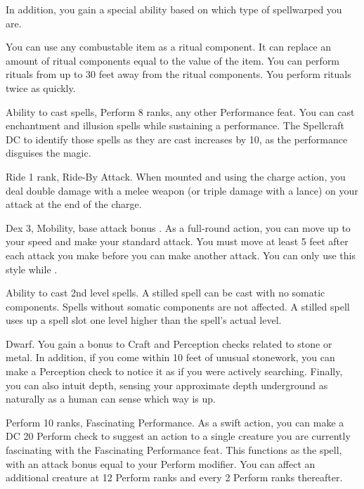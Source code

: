 In addition, you gain a special ability based on which type of spellwarped you are.

 \x
{} You can use any combustable item as a ritual component. It can replace an amount of ritual components equal to the value of the item.
 You can perform rituals from up to 30 feet away from the ritual components.
 You perform rituals twice as quickly.

\featpre Ability to cast spells, Perform 8 ranks, any other Performance feat.
\featben You can cast enchantment and illusion spells while sustaining a performance. The Spellcraft DC to identify those spells as they are cast increases by 10, as the performance disguises the magic.

 Ride 1 rank, Ride-By Attack.
 When mounted and using the charge action, you deal double damage with a melee weapon (or triple damage with a lance) on your attack at the end of the charge.%

 Dex 3, Mobility, base attack bonus .
 As a full-round action, you can move up to your speed and make your standard attack. You must move at least 5 feet after each attack you make before you can make another attack. You can only use this style while \unencumbered.

 Ability to cast 2nd level spells.
 A stilled spell can be cast with no somatic components. Spells without somatic components are not affected. A stilled spell uses up a spell slot one level higher than the spell's actual level.

 Dwarf.
 You gain a  bonus to Craft and Perception checks related to stone or metal. In addition, if you come within 10 feet of unusual stonework, you can make a Perception check to notice it as if you were actively searching. Finally, you can also intuit depth, sensing your approximate depth underground as naturally as a human can sense which way is up.

\featpre Perform 10 ranks, Fascinating Performance.
\featben As a swift action, you can make a DC 20 Perform check to suggest an action to a single creature you are currently fascinating with the Fascinating Performance feat. This functions as the  spell, with an attack bonus equal to your Perform modifier. You can affect an additional creature at 12 Perform ranks and every 2 Perform ranks thereafter.

